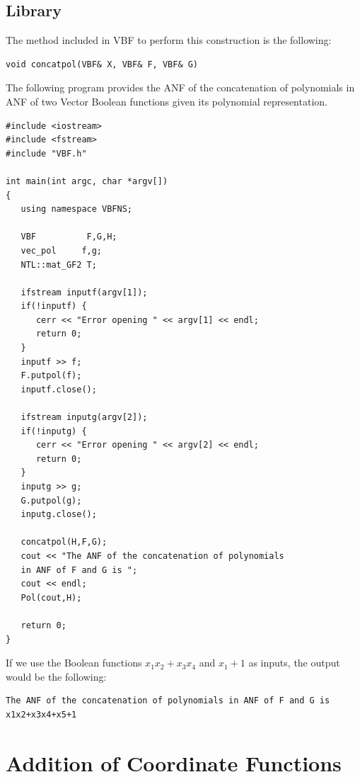 \subsection{Library}

The method included in VBF to perform this construction is the following:

\begin{verbatim}
void concatpol(VBF& X, VBF& F, VBF& G)  
\end{verbatim}

\begin{example}
The following program provides the ANF of the concatenation of polynomials in ANF of two Vector Boolean functions given its polynomial representation.

\begin{verbatim}
#include <iostream>
#include <fstream>
#include "VBF.h"

int main(int argc, char *argv[])
{
   using namespace VBFNS;

   VBF          F,G,H;
   vec_pol     f,g;
   NTL::mat_GF2 T;

   ifstream inputf(argv[1]);
   if(!inputf) {
      cerr << "Error opening " << argv[1] << endl;
      return 0;
   }
   inputf >> f;
   F.putpol(f);
   inputf.close();

   ifstream inputg(argv[2]);
   if(!inputg) {
      cerr << "Error opening " << argv[2] << endl;
      return 0;
   }
   inputg >> g;
   G.putpol(g);
   inputg.close();

   concatpol(H,F,G);
   cout << "The ANF of the concatenation of polynomials 
   in ANF of F and G is ";
   cout << endl;
   Pol(cout,H);

   return 0;
}

\end{verbatim}

If we use the Boolean functions $x_1x_2+x_3x_4$ and $x_1+1$ as inputs, the output would be the following:

\begin{verbatim}
The ANF of the concatenation of polynomials in ANF of F and G is 
x1x2+x3x4+x5+1
\end{verbatim}

\end{example}

\section{Addition of Coordinate Functions}

